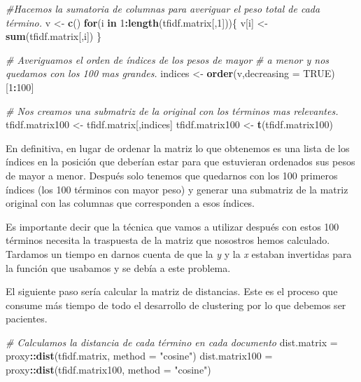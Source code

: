 \documentclass[spanish,]{article}
\newenvironment{Shaded}{\begin{snugshade}}{\end{snugshade}}
\newcommand{\KeywordTok}[1]{\textcolor[rgb]{0.13,0.29,0.53}{\textbf{#1}}}
\newcommand{\DataTypeTok}[1]{\textcolor[rgb]{0.13,0.29,0.53}{#1}}
\newcommand{\DecValTok}[1]{\textcolor[rgb]{0.00,0.00,0.81}{#1}}
\newcommand{\StringTok}[1]{\textcolor[rgb]{0.31,0.60,0.02}{#1}}
\newcommand{\CommentTok}[1]{\textcolor[rgb]{0.56,0.35,0.01}{\textit{#1}}}
\newcommand{\OtherTok}[1]{\textcolor[rgb]{0.56,0.35,0.01}{#1}}
\newcommand{\ControlFlowTok}[1]{\textcolor[rgb]{0.13,0.29,0.53}{\textbf{#1}}}
\newcommand{\OperatorTok}[1]{\textcolor[rgb]{0.81,0.36,0.00}{\textbf{#1}}}
\newcommand{\NormalTok}[1]{#1}
\begin{document}
\begin{Shaded}
\begin{Highlighting}[]
\CommentTok{#Hacemos la sumatoria de columnas para averiguar el peso total de cada término.}
\NormalTok{v <-}\StringTok{ }\KeywordTok{c}\NormalTok{()}
\ControlFlowTok{for}\NormalTok{(i }\ControlFlowTok{in} \DecValTok{1}\OperatorTok{:}\KeywordTok{length}\NormalTok{(tfidf.matrix[,}\DecValTok{1}\NormalTok{]))\{}
\NormalTok{  v[i] <-}\StringTok{ }\KeywordTok{sum}\NormalTok{(tfidf.matrix[,i])}
\NormalTok{\}}

\CommentTok{# Averiguamos el orden de índices de los pesos de mayor}
\CommentTok{# a menor y nos quedamos con los 100 mas grandes.}
\NormalTok{indices <-}\StringTok{ }\KeywordTok{order}\NormalTok{(v,}\DataTypeTok{decreasing =} \OtherTok{TRUE}\NormalTok{)[}\DecValTok{1}\OperatorTok{:}\DecValTok{100}\NormalTok{]}

\CommentTok{# Nos creamos una submatriz de la original con los términos mas relevantes.}
\NormalTok{tfidf.matrix100 <-}\StringTok{ }\NormalTok{tfidf.matrix[,indices]}
\NormalTok{tfidf.matrix100 <-}\StringTok{ }\KeywordTok{t}\NormalTok{(tfidf.matrix100)}
\end{Highlighting}
\end{Shaded}

En definitiva, en lugar de ordenar la matriz lo que obtenemos es una
lista de los índices en la posición que deberían estar para que
estuvieran ordenados sus pesos de mayor a menor. Después solo tenemos
que quedarnos con los 100 primeros índices (los 100 términos con mayor
peso) y generar una submatriz de la matriz original con las columnas que
corresponden a esos índices.

Es importante decir que la técnica que vamos a utilizar después con
estos 100 términos necesita la traspuesta de la matriz que nosostros
hemos calculado. Tardamos un tiempo en darnos cuenta de que la \emph{y}
y la \emph{x} estaban invertidas para la función que usabamos y se debía
a este problema.

El siguiente paso sería calcular la matriz de distancias. Este es el
proceso que consume más tiempo de todo el desarrollo de clustering por
lo que debemos ser pacientes.

\begin{Shaded}
\begin{Highlighting}[]
\CommentTok{# Calculamos la distancia de cada término en cada documento}
\NormalTok{dist.matrix =}\StringTok{ }\NormalTok{proxy}\OperatorTok{::}\KeywordTok{dist}\NormalTok{(tfidf.matrix, }\DataTypeTok{method =} \StringTok{"cosine"}\NormalTok{)}
\NormalTok{dist.matrix100 =}\StringTok{ }\NormalTok{proxy}\OperatorTok{::}\KeywordTok{dist}\NormalTok{(tfidf.matrix100, }\DataTypeTok{method =} \StringTok{"cosine"}\NormalTok{)}
\end{Highlighting}
\end{Shaded}
\end{document}
